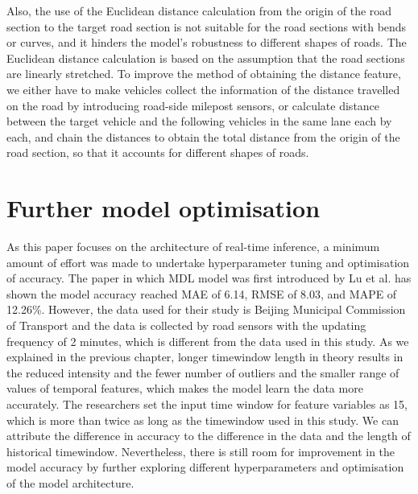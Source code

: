 \documentclass[11pt]{uonthesis}
\begin{document}
Also, the use of the Euclidean distance calculation from the origin of the road section to the target road section is not suitable for the road sections with bends or curves, and it hinders the model's robustness to different shapes of roads. The Euclidean distance calculation is based on the assumption that the road sections are linearly stretched. To improve the method of obtaining the distance feature, we either have to make vehicles collect the information of the distance travelled on the road by introducing road-side milepost sensors, or calculate distance between the target vehicle and the following vehicles in the same lane each by each, and chain the distances to obtain the total distance from the origin of the road section, so that it accounts for different shapes of roads.

\section{Further model optimisation}

As this paper focuses on the architecture of real-time inference, a minimum amount of effort was made to undertake hyperparameter tuning and optimisation of accuracy. The paper in which MDL model was first introduced by Lu et al.\cite{9284587} has shown the model accuracy reached MAE of 6.14, RMSE of 8.03, and MAPE of 12.26\%. However, the data used for their study is Beijing Municipal Commission of Transport and the data is collected by road sensors with the updating frequency of 2 minutes, which is different from the data used in this study. As we explained in the previous chapter, longer timewindow length in theory results in the reduced intensity and the fewer number of outliers and the smaller range of values of temporal features, which makes the model learn the data more accurately. The researchers set the input time window for feature variables as 15, which is more than twice as long as the timewindow used in this study. We can attribute the difference in accuracy to the difference in the data and the length of historical timewindow. Nevertheless, there is still room for improvement in the model accuracy by further exploring different hyperparameters and optimisation of the model architecture.
\end{document}
